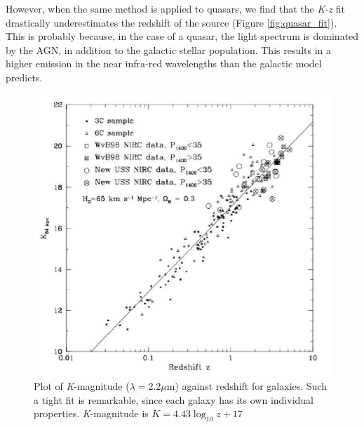 \documentclass[11pt,a4paper]{report}
\begin{document}
	However, when the same method is applied to quasars, we find that
	the \textit{K-z} fit drastically underestimates the redshift of the source (Figure \ref{fig:quasar_fit}).
	This is probably because, in the case of a quasar, the light spectrum is dominated by the
	AGN, in addition to the galactic stellar population. This results in a higher
	emission in the near infra-red wavelengths than the galactic model predicts.\\
	

	\begin{figure}[h!]
		\centering
		\includegraphics[scale=0.85]{galaxies_fit.PNG}
		\caption[Fit for galaxies]{{\small Plot of \textit{K}-magnitude ($\lambda
			= 2.2 \mu$m) against redshift for galaxies. Such a tight fit is remarkable, since each galaxy has its own individual properties. \textit{K}-magnitude is $K = 4.43\log_{10}z + 17$}}
		\label{fig:galaxy_fit}
	\end{figure}
\end{document}

